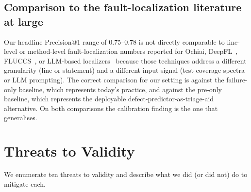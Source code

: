 \documentclass[preprint,12pt]{elsarticle}
\begin{document}
\subsection{Comparison to the fault-localization literature at large}

Our headline Precision@1 range of 0.75--0.78 is not directly comparable to line-level or method-level fault-localization numbers reported for Ochiai, DeepFL~\cite{li2019deepfl}, FLUCCS~\cite{sohn2017fluccs}, or LLM-based localizers~\cite{yang2024llmao,kang2024llmfl,rezaalipour2024pyfl} because those techniques address a different granularity (line or statement) and a different input signal (test-coverage spectra or LLM prompting). The correct comparison for our setting is against the failure-only baseline, which represents today's practice, and against the pre-only baseline, which represents the deployable defect-predictor-as-triage-aid alternative. On both comparisons the calibration finding is the one that generalises.

\section{Threats to Validity}
\label{sec:threats}

We enumerate ten threats to validity and describe what we did (or did not) do to mitigate each.
\end{document}
